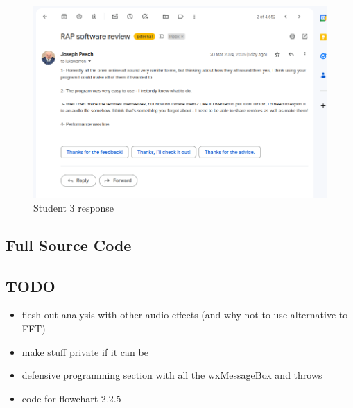\documentclass{article}
\begin{document}
	\begin{figure}[H]
		\includegraphics[width=14cm]{./joseph evaluation.png}
		\caption{Student 3 response}
	\end{figure}
	
	\pagebreak
	\subsection{Full Source Code}
	
	
	\subsection{TODO}
	\begin{itemize}
		\item flesh out analysis with other audio effects (and why not to use alternative to FFT)
		\item make stuff private if it can be
		\item defensive programming section with all the wxMessageBox and throws
		\item code for flowchart 2.2.5
	\end{itemize}
\end{document}
